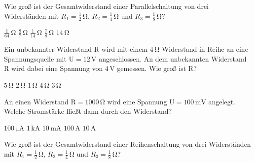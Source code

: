 \documentclass[11pt]{exam}
\begin{document}
\setlength{\voffset}{-0.5in}
\setlength{\headsep}{5pt}

\hspace{2mm}
 \hspace{5mm}
\vspace{4mm}

\begin{questions}

\question Wie groß ist der Gesamtwiderstand einer Parallelschaltung von drei Widerständen mit \(R_1=\mathrm{\frac{1}{2}\,\Omega}\), \(R_2=\mathrm{\frac{1}{4}\,\Omega}\) und \(R_3=\mathrm{\frac{1}{8}\,\Omega}\)?

\begin{choices}
	\choice \(\mathrm{\frac{1}{64}\,\Omega}\)
	\choice \(\mathrm{\frac{8}{7}\,\Omega}\)
	\choice \(\mathrm{\frac{1}{14}\,\Omega}\)
	\choice \(\mathrm{\frac{7}{8}\,\Omega}\)
	\choice \(\mathrm{14\,\Omega}\)
\end{choices}

\vspace{3mm}\question Ein unbekannter Widerstand \(\mathrm{R}\) wird mit einem \(\mathrm{4\,\Omega}\)-Widerstand in Reihe an eine Spannungsquelle mit \(\mathrm{U=12\,V}\) angeschlossen. An dem unbekannten Widerstand \(\mathrm{R}\) wird dabei eine Spannung von \(\mathrm{4\,V}\) gemessen. Wie groß ist \(\mathrm{R}\)?

\begin{choices}
	\choice \(\mathrm{5\,\Omega}\)
	\choice \(\mathrm{2\,\Omega}\)
	\choice \(\mathrm{1\,\Omega}\)
	\choice \(\mathrm{4\,\Omega}\)
	\choice \(\mathrm{3\,\Omega}\)
\end{choices}

\vspace{3mm}\question An einen Widerstand \(\mathrm{R=1000\,\Omega}\) wird eine Spannung \(\mathrm{U=100\,mV}\) angelegt. Welche Stromstärke fließt dann durch den Widerstand?

\begin{choices}
	\choice \(\mathrm{100\,\mu A}\)
	\choice \(\mathrm{1\,kA}\)
	\choice \(\mathrm{10\,mA}\)
	\choice \(\mathrm{100\,A}\)
	\choice \(\mathrm{10\,A}\)
\end{choices}

\vspace{3mm}\question Wie groß ist der Gesamtwiderstand einer Reihenschaltung von drei Widerständen mit \(R_1=\mathrm{\frac{1}{2}\,\Omega}\), \(R_2=\mathrm{\frac{1}{4}\,\Omega}\) und \(R_3=\mathrm{\frac{1}{8}\,\Omega}\)?


\end{questions}
\end{document}

